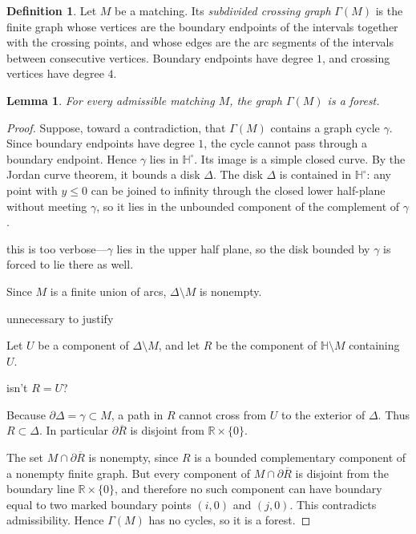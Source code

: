 \documentclass[12pt]{article}
\newcommand{\RR}{\mathbb{R}}
\newcommand{\HH}{\mathbb{H}}
\newcommand{\bd}{\partial}
\newtheorem{lemma}[theorem]{Lemma}
\theoremstyle{definition}
\newtheorem{definition}[theorem]{Definition}
\newcommand{\review}[1]{\begin{reviewbox}#1\end{reviewbox}}
\begin{document}
\begin{definition}
Let \(M\) be a matching.  Its \emph{subdivided crossing graph} \(\Gamma(M)\) is the finite graph whose vertices are the boundary endpoints of the intervals together with the crossing points, and whose edges are the arc segments of the intervals between consecutive vertices.  Boundary endpoints have degree \(1\), and crossing vertices have degree \(4\).
\end{definition}

\begin{lemma}\label{lem:forest}
For every admissible matching \(M\), the graph \(\Gamma(M)\) is a forest.
\end{lemma}

\begin{proof}
Suppose, toward a contradiction, that \(\Gamma(M)\) contains a graph cycle \(\gamma\).  Since boundary endpoints have degree \(1\), the cycle cannot pass through a boundary endpoint.  Hence \(\gamma\) lies in \(\HH^\circ\).  Its image is a simple closed curve.  By the Jordan curve theorem, it bounds a disk \(\Delta\).  The disk \(\Delta\) is contained in \(\HH^\circ\): any point with \(y\leq 0\) can be joined to infinity through the closed lower half-plane without meeting \(\gamma\), so it lies in the unbounded component of the complement of \(\gamma\).\review{this is too verbose---$\gamma$ lies in the upper half plane, so the disk bounded by $\gamma$ is forced to lie there as well.}

Since \(M\) is a finite union of arcs, \(\Delta\setminus M\) is nonempty.\review{unnecessary to justify}  Let \(U\) be a component of \(\Delta\setminus M\), and let \(R\) be the component of \(\HH\setminus M\) containing \(U\). \review{isn't $R=U$?} Because \(\bd\Delta=\gamma\subset M\), a path in \(R\) cannot cross from \(U\) to the exterior of \(\Delta\).  Thus \(R\subset\Delta\).  In particular \(\bd\overline R\) is disjoint from \(\RR\times\{0\}\).

The set \(M\cap\bd\overline R\) is nonempty, since \(R\) is a bounded complementary component of a nonempty finite graph.  But every component of \(M\cap\bd\overline R\) is disjoint from the boundary line \(\RR\times\{0\}\), and therefore no such component can have boundary equal to two marked boundary points \((i,0)\) and \((j,0)\).  This contradicts admissibility.  Hence \(\Gamma(M)\) has no cycles, so it is a forest.
\end{proof}
\end{document}
